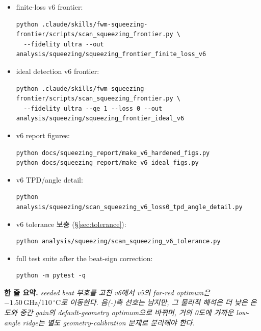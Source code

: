 \documentclass[11pt,a4paper]{article}
\newcommand{\GHz}{\,\mathrm{GHz}}
\newcommand{\degC}{\,^{\circ}\mathrm{C}}
\begin{document}
\begin{itemize}[leftmargin=1.5em]
\item finite-loss v6 frontier:
\begin{verbatim}
python .claude/skills/fwm-squeezing-frontier/scripts/scan_squeezing_frontier.py \
  --fidelity ultra --out analysis/squeezing/squeezing_frontier_finite_loss_v6
\end{verbatim}
\item ideal detection v6 frontier:
\begin{verbatim}
python .claude/skills/fwm-squeezing-frontier/scripts/scan_squeezing_frontier.py \
  --fidelity ultra --qe 1 --loss 0 --out analysis/squeezing/squeezing_frontier_ideal_v6
\end{verbatim}
\item v6 report figures:
\begin{verbatim}
python docs/squeezing_report/make_v6_hardened_figs.py
python docs/squeezing_report/make_v6_ideal_figs.py
\end{verbatim}
\item v6 TPD/angle detail:
\begin{verbatim}
python analysis/squeezing/scan_squeezing_v6_loss0_tpd_angle_detail.py
\end{verbatim}
\item v6 tolerance 보충 (\S\ref{sec:tolerance}):
\begin{verbatim}
python analysis/squeezing/scan_squeezing_v6_tolerance.py
\end{verbatim}
\item full test suite after the beat-sign correction:
\begin{verbatim}
python -m pytest -q
\end{verbatim}
\end{itemize}

\noindent
\textbf{한 줄 요약.}
\emph{seeded beat 부호를 고친 v6에서 v5의 far-red optimum은
$-1.50\GHz/110\degC$로 이동한다. 음(-)측 선호는 남지만, 그 물리적 해석은
더 낮은 온도와 중간 gain의 default-geometry optimum으로 바뀌며, 거의 0도에
가까운 low-angle ridge는 별도 geometry-calibration 문제로 분리해야 한다.}
\end{document}
